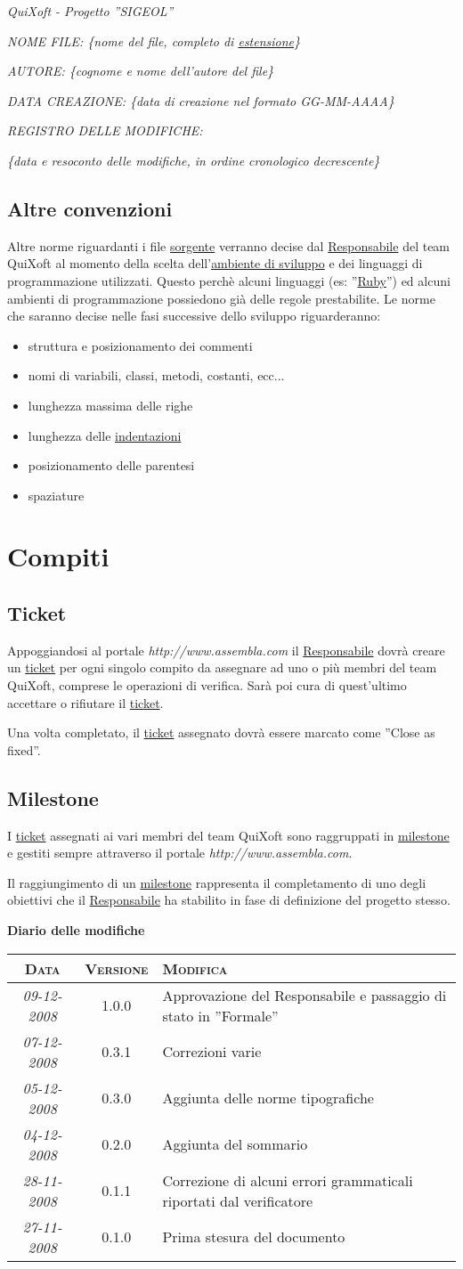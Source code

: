 \documentclass[11pt,a4paper]{article}
\newcommand{\modifiche} 
{
\newpage
\begin{center}
\textbf{Diario delle modifiche} \\
\bigskip
\begin{tabular}{|c|c|p{0.62\textwidth}|}
\hline
\textsc{Data} & \textsc{Versione} & \textsc{Modifica} \\
\hline
\hline
\textit{09-12-2008} & 1.0.0 & Approvazione del Responsabile e passaggio di stato in ''Formale''\\
\hline
\textit{07-12-2008} & 0.3.1 & Correzioni varie \\
\hline
\textit{05-12-2008} & 0.3.0 & Aggiunta delle norme tipografiche \\
\hline
\textit{04-12-2008} & 0.2.0 & Aggiunta del sommario \\
\hline
\textit{28-11-2008} & 0.1.1 & Correzione di alcuni errori grammaticali riportati dal verificatore \\
\hline
\textit{27-11-2008} & 0.1.0 & Prima stesura del documento \\
\hline
\end{tabular}
\end{center}
}
\begin{document}
\textit{QuiXoft - Progetto ''SIGEOL''}

\textit{NOME FILE: \{nome del file, completo di \underline{estensione}\}}

\textit{AUTORE: \{cognome e nome dell'autore del file\}}

\textit{DATA CREAZIONE: \{data di creazione nel formato GG-MM-AAAA\}}

\textit{REGISTRO DELLE MODIFICHE:}

\textit{\{data e resoconto delle modifiche, in ordine cronologico decrescente\}}
\subsection{Altre convenzioni}
Altre norme riguardanti i file \underline{sorgente} verranno decise dal \underline{Responsabile} del team QuiXoft al momento della scelta dell'\underline{ambiente di sviluppo} e dei linguaggi di programmazione utilizzati. Questo perchè alcuni linguaggi (es: ''\underline{Ruby}'') ed alcuni ambienti di programmazione possiedono già delle regole prestabilite. Le norme che saranno decise nelle fasi successive dello sviluppo riguarderanno:
\begin{itemize}
	\item struttura e posizionamento dei commenti
	\item nomi di variabili, classi, metodi, costanti, ecc...
	\item lunghezza massima delle righe
	\item lunghezza delle \underline{indentazioni}
	\item posizionamento delle parentesi
	\item spaziature
\end{itemize}
\section{Compiti}
\subsection{Ticket}
Appoggiandosi al portale \textit{http://www.assembla.com} il \underline{Responsabile} dovrà creare un \underline{ticket} per ogni singolo compito da assegnare ad uno o più membri del team QuiXoft, comprese le operazioni di verifica.
Sarà poi cura di quest'ultimo accettare o rifiutare il \underline{ticket}.

Una volta completato, il \underline{ticket} assegnato dovrà essere marcato come ''Close as fixed''.
\subsection{Milestone}
I \underline{ticket} assegnati ai vari membri del team QuiXoft sono raggruppati in \underline{milestone} e gestiti sempre attraverso il portale \textit{http://www.assembla.com}.

Il raggiungimento di un \underline{milestone} rappresenta il completamento di uno degli obiettivi che il \underline{Responsabile} ha stabilito in fase di definizione del progetto stesso.
\modifiche
\end{document}
